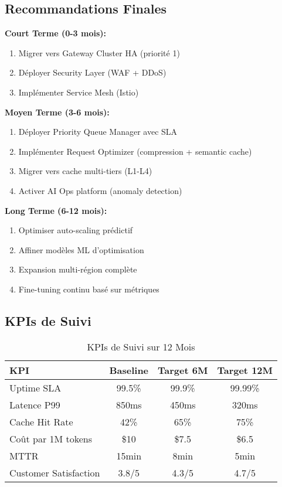 \documentclass[12pt,a4paper]{article}
\begin{document}
\subsection{Recommandations Finales}

\begin{tcolorbox}[colback=blue!5,colframe=blue!50!black,title=\textbf{Action Plan}]
\textbf{Court Terme (0-3 mois):}
\begin{enumerate}[noitemsep]
    \item Migrer vers Gateway Cluster HA (priorité 1)
    \item Déployer Security Layer (WAF + DDoS)
    \item Implémenter Service Mesh (Istio)
\end{enumerate}

\textbf{Moyen Terme (3-6 mois):}
\begin{enumerate}[noitemsep]
    \item Déployer Priority Queue Manager avec SLA
    \item Implémenter Request Optimizer (compression + semantic cache)
    \item Migrer vers cache multi-tiers (L1-L4)
    \item Activer AI Ops platform (anomaly detection)
\end{enumerate}

\textbf{Long Terme (6-12 mois):}
\begin{enumerate}[noitemsep]
    \item Optimiser auto-scaling prédictif
    \item Affiner modèles ML d'optimisation
    \item Expansion multi-région complète
    \item Fine-tuning continu basé sur métriques
\end{enumerate}
\end{tcolorbox}

\subsection{KPIs de Suivi}

\begin{table}[h]
\centering
\small
\begin{tabular}{|l|c|c|c|}
\hline
\textbf{KPI} & \textbf{Baseline} & \textbf{Target 6M} & \textbf{Target 12M} \\
\hline
Uptime SLA & 99.5\% & 99.9\% & 99.99\% \\
Latence P99 & 850ms & 450ms & 320ms \\
Cache Hit Rate & 42\% & 65\% & 75\% \\
Coût par 1M tokens & \$10 & \$7.5 & \$6.5 \\
MTTR & 15min & 8min & 5min \\
Customer Satisfaction & 3.8/5 & 4.3/5 & 4.7/5 \\
\hline
\end{tabular}
\caption{KPIs de Suivi sur 12 Mois}
\end{table}
\end{document}

